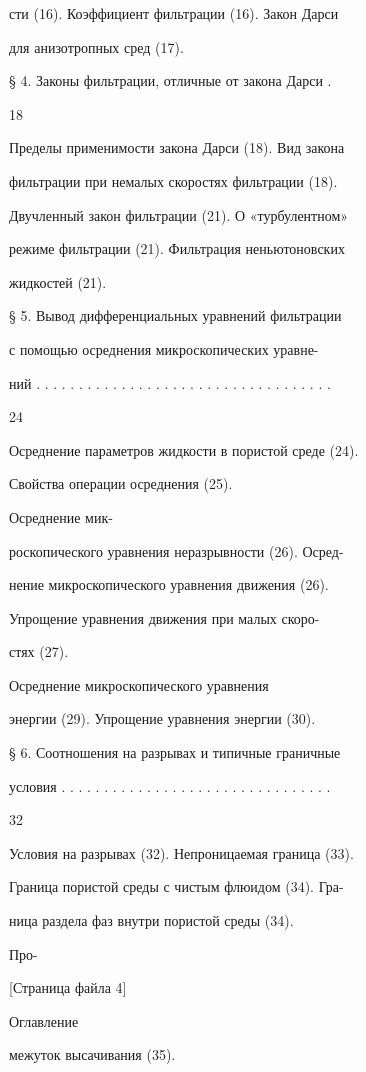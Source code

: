 \documentclass[
  11pt,
]{article}
\begin{document}
сти (16). Коэффициент фильтрации (16). Закон Дарси\par
для анизотропных сред (17).\par
§ 4. Законы фильтрации, отличные от закона Дарси .\par
18\par
Пределы применимости закона Дарси (18). Вид закона\par
фильтрации при немалых скоростях фильтрации (18).\par
Двучленный закон фильтрации (21). О «турбулентном»\par
режиме фильтрации (21). Фильтрация неньютоновских\par
жидкостей (21).\par
§ 5. Вывод дифференциальных уравнений фильтрации\par
с помощью осреднения микроскопических уравне-\par
ний . . . . . . . . . . . . . . . . . . . . . . . . . . . . . . . . . . .\par
24\par
Осреднение параметров жидкости в пористой среде (24).\par
Свойства операции осреднения (25).\par
Осреднение мик-\par
роскопического уравнения неразрывности (26). Осред-\par
нение микроскопического уравнения движения (26).\par
Упрощение уравнения движения при малых скоро-\par
стях (27).\par
Осреднение микроскопического уравнения\par
энергии (29). Упрощение уравнения энергии (30).\par
§ 6. Соотношения на разрывах и типичные граничные\par
условия . . . . . . . . . . . . . . . . . . . . . . . . . . . . . . . .\par
32\par
Условия на разрывах (32). Непроницаемая граница (33).\par
Граница пористой среды с чистым флюидом (34). Гра-\par
ница раздела фаз внутри пористой среды (34).\par
Про-\par
\smallskip
{[}Страница файла 4{]}\par
Оглавление\par
межуток высачивания (35).\par
\end{document}
